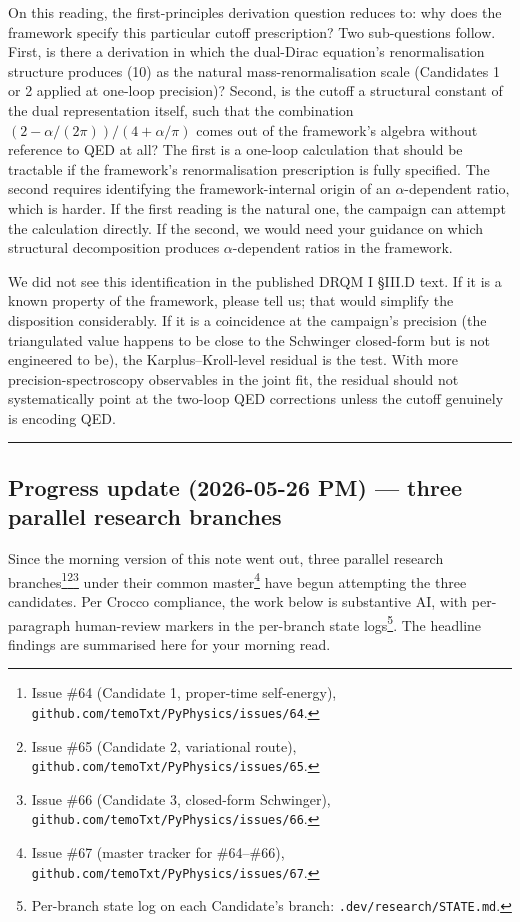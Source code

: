 \documentclass[
  11pt,
]{article}
\begin{document}
On this reading, the first-principles derivation question reduces to:
why does the framework specify this particular cutoff prescription? Two
sub-questions follow. First, is there a derivation in which the
dual-Dirac equation's renormalisation structure produces (10) as the
natural mass-renormalisation scale (Candidates 1 or 2 applied at
one-loop precision)? Second, is the cutoff a structural constant of the
dual representation itself, such that the combination
\((2 - \alpha/(2\pi))/(4 + \alpha/\pi)\) comes out of the framework's
algebra without reference to QED at all? The first is a one-loop
calculation that should be tractable if the framework's renormalisation
prescription is fully specified. The second requires identifying the
framework-internal origin of an \(\alpha\)-dependent ratio, which is
harder. If the first reading is the natural one, the campaign can
attempt the calculation directly. If the second, we would need your
guidance on which structural decomposition produces \(\alpha\)-dependent
ratios in the framework.

We did not see this identification in the published DRQM I §III.D text.
If it is a known property of the framework, please tell us; that would
simplify the disposition considerably. If it is a coincidence at the
campaign's precision (the triangulated value happens to be close to the
Schwinger closed-form but is not engineered to be), the
Karplus--Kroll-level residual is the test. With more
precision-spectroscopy observables in the joint fit, the residual should
not systematically point at the two-loop QED corrections unless the
cutoff genuinely is encoding QED.

\begin{center}\rule{0.5\linewidth}{0.5pt}\end{center}

\hypertarget{progress-update-2026-05-26-pm-three-parallel-research-branches}{%
\subsection{Progress update (2026-05-26 PM) --- three parallel research
branches}\label{progress-update-2026-05-26-pm-three-parallel-research-branches}}

Since the morning version of this note went out, three parallel research
branches\footnote{Issue \#64 (Candidate 1, proper-time self-energy),
  \texttt{github.com/temoTxt/PyPhysics/issues/64}.}\footnote{Issue \#65
  (Candidate 2, variational route),
  \texttt{github.com/temoTxt/PyPhysics/issues/65}.}\footnote{Issue \#66
  (Candidate 3, closed-form Schwinger),
  \texttt{github.com/temoTxt/PyPhysics/issues/66}.} under their common
master\footnote{Issue \#67 (master tracker for \#64--\#66),
  \texttt{github.com/temoTxt/PyPhysics/issues/67}.} have begun
attempting the three candidates. Per Crocco compliance, the work below
is substantive AI, with per-paragraph human-review markers in the
per-branch state logs\footnote{Per-branch state log on each Candidate's
  branch: \texttt{.dev/research/STATE.md}.}. The headline findings are
summarised here for your morning read.
\end{document}

